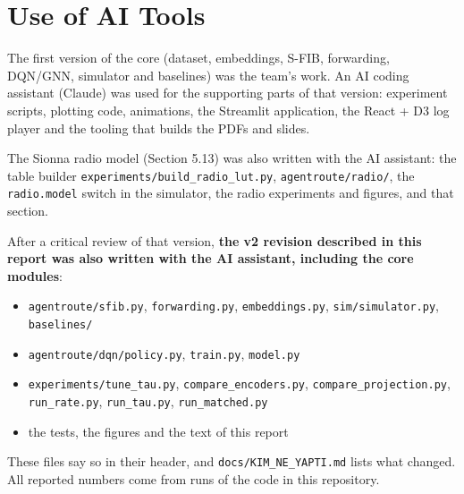 \documentclass[journal]{IEEEtran}
\begin{document}
\section{Use of AI Tools}
The first version of the core (dataset, embeddings, S-FIB, forwarding, DQN/GNN, simulator and baselines) was the team's work. An AI coding assistant (Claude) was used for the supporting parts of that version: experiment scripts, plotting code, animations, the Streamlit application, the React + D3 log player and the tooling that builds the PDFs and slides.

The Sionna radio model (Section 5.13) was also written with the AI assistant: the table builder \texttt{experiments/\allowbreak build\_\allowbreak radio\_\allowbreak lut.py}, \texttt{agentroute/\allowbreak radio/\allowbreak }, the \texttt{radio.model} switch in the simulator, the radio experiments and figures, and that section.

After a critical review of that version, \textbf{the v2 revision described in this report was also written with the AI assistant, including the core modules}:

\begin{itemize}
\item \texttt{agentroute/\allowbreak sfib.py}, \texttt{forwarding.py}, \texttt{embeddings.py}, \texttt{sim/\allowbreak simulator.py}, \texttt{baselines/\allowbreak *}
\item \texttt{agentroute/\allowbreak dqn/\allowbreak policy.py}, \texttt{train.py}, \texttt{model.py}
\item \texttt{experiments/\allowbreak tune\_\allowbreak tau.py}, \texttt{compare\_\allowbreak encoders.py}, \texttt{compare\_\allowbreak projection.py}, \texttt{run\_\allowbreak rate.py}, \texttt{run\_\allowbreak tau.py}, \texttt{run\_\allowbreak matched.py}
\item the tests, the figures and the text of this report
\end{itemize}

These files say so in their header, and \texttt{docs/\allowbreak KIM\_\allowbreak NE\_\allowbreak YAPTI.md} lists what changed. All reported numbers come from runs of the code in this repository.
\end{document}

